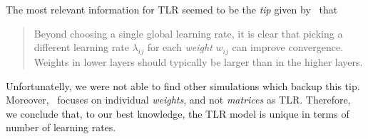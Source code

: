 The most relevant information for TLR seemed to be the \emph{tip} given by~\citet{lecun2012efficient} that \blockquote{Beyond choosing a single global learning rate, it is clear that picking a different learning rate $\lambda_{ij}$ for each \emph{weight} $w_{ij}$ can improve convergence. Weights in lower layers should typically be larger than in the higher layers.} Unfortunatelly, we were not able to find other simulations which backup this tip. Moreover,~\citet{lecun2012efficient} focuses on individual \emph{weights}, and not \emph{matrices} as TLR. Therefore, we conclude that, to our best knowledge, the TLR model is unique in terms of number of learning rates. 

